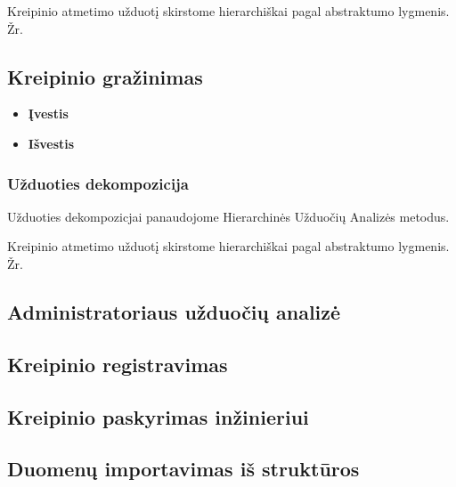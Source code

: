 	
	Kreipinio atmetimo užduotį skirstome hierarchiškai pagal abstraktumo lygmenis. Žr. 
	
	\subsection {Kreipinio gražinimas}	
	
		\begin{itemize}
			\item \textbf{Įvestis}
			\item \textbf{Išvestis} 
		\end{itemize}

	\subsubsection {Užduoties dekompozicija}

	Užduoties dekompozicjai panaudojome Hierarchinės Užduočių Analizės metodus.
 		

	Kreipinio atmetimo užduotį skirstome hierarchiškai pagal abstraktumo lygmenis. Žr. 

\subsection {Administratoriaus užduočių analizė}

	\subsection {Kreipinio registravimas}

	\subsection {Kreipinio paskyrimas inžinieriui}

	\subsection {Duomenų importavimas iš struktūros}
	
